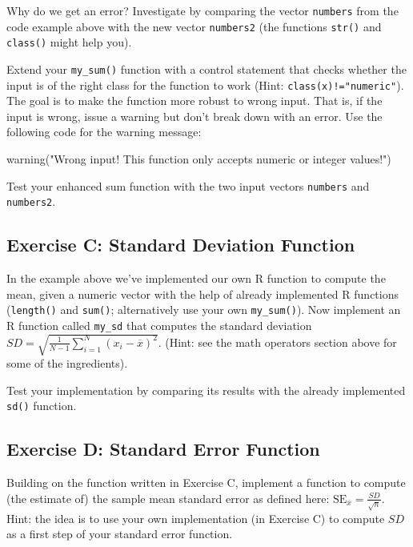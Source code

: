 \documentclass[
  12pt,
]{style/krantz}
\newenvironment{Shaded}{\begin{snugshade}}{\end{snugshade}}
\newcommand{\FunctionTok}[1]{\textcolor[rgb]{0.00,0.00,0.00}{#1}}
\newcommand{\NormalTok}[1]{#1}
\newcommand{\StringTok}[1]{\textcolor[rgb]{0.31,0.60,0.02}{#1}}
\begin{document}
Why do we get an error? Investigate by comparing the vector \texttt{numbers} from the code example above with the new vector \texttt{numbers2} (the functions \texttt{str()} and \texttt{class()} might help you).

Extend your \texttt{my\_sum()} function with a control statement that checks whether the input is of the right class for the function to work (Hint: \texttt{class(x)!="numeric"}). The goal is to make the function more robust to wrong input. That is, if the input is wrong, issue a warning but don't break down with an error. Use the following code for the warning message:

\begin{Shaded}
\begin{Highlighting}[]
\FunctionTok{warning}\NormalTok{(}\StringTok{"Wrong input! This function only accepts numeric or integer values!"}\NormalTok{)}
\end{Highlighting}
\end{Shaded}

Test your enhanced sum function with the two input vectors \texttt{numbers} and \texttt{numbers2}.

\hypertarget{exercise-c-standard-deviation-function}{%
\subsection{Exercise C: Standard Deviation Function}\label{exercise-c-standard-deviation-function}}

In the example above we've implemented our own R function to compute the mean, given a numeric vector with the help of already implemented R functions (\texttt{length()} and \texttt{sum()}; alternatively use your own \texttt{my\_sum()}). Now implement an R function called \texttt{my\_sd} that computes the standard deviation \(SD = \sqrt{\frac{1}{N-1} \sum_{i=1}^N (x_i - \overline{x})^2}\). (Hint: see the math operators section above for some of the ingredients).

Test your implementation by comparing its results with the already implemented \texttt{sd()} function.

\hypertarget{exercise-d-standard-error-function}{%
\subsection{Exercise D: Standard Error Function}\label{exercise-d-standard-error-function}}

Building on the function written in Exercise C, implement a function to compute (the estimate of) the sample mean standard error as defined here: \(\text{SE}_{\bar{x}} = \frac{SD}{\sqrt{n}}\). Hint: the idea is to use your own implementation (in Exercise C) to compute \(SD\) as a first step of your standard error function.
\end{document}
